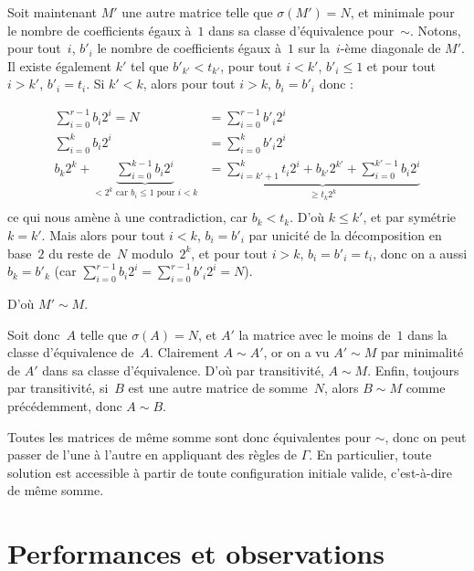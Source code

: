 Soit maintenant $M'$ une autre matrice telle que $\sigma (M')=N$, et minimale pour le nombre de coefficients égaux à~$1$ dans sa classe d'équivalence pour~$\sim$. Notons, pour tout~$i$, $b'_i$ le nombre de coefficients égaux à~$1$ sur la~$i$-ème diagonale de $M'$. Il existe également $k'$ tel que $b'_{k'} < t_{k'}$, pour tout $i<k'$, $b'_i \leq 1$ et pour tout $i>k'$, $b'_i=t_i$. Si $k'<k$, alors pour tout $i>k$, $b_i= b'_i$ donc : 


\begin{align*}
\sum\limits_{i=0}^{r-1}b_i 2^i = N &= \sum\limits_{i=0}^{r-1}b'_i 2^i\\
\sum\limits_{i=0}^k b_i 2^i &= \sum\limits_{i=0}^k b'_i 2^i\\
b_k 2^k + \underbrace{\sum\limits_{i=0}^{k-1} b_i 2^i}_{\text{$< 2^k$ car $b_i \leq 1$ pour $i<k$}} &=\underbrace{\sum\limits_{i=k'+1}^k t_i 2^i + b_{k'} 2^{k'} + \sum\limits_{i=0}^{k' -1} b_i 2^i}_{\geq t_k 2^k}\\
\end{align*}
ce qui nous amène à une contradiction, car $b_k<t_k$. D'où $k \leq k'$, et par symétrie $k = k'$. Mais alors pour tout $i<k$, $b_i = b'_i$ par unicité de la décomposition en base~$2$ du reste de~$N$ modulo~$2^k$, et pour tout $i>k$, $b_i = b'_i = t_i$, donc on a aussi $b_k = b'_k$ (car $\sum\limits_{i=0}^{r-1} b_i 2^i = \sum\limits_{i=0}^{r-1} b'_i 2^i = N$).

D'où $M' \sim M$. 

Soit donc~$A$ telle que $\sigma(A)=N$, et $A'$ la matrice avec le moins de~$1$ dans la classe d'équi\-valence de~$A$. Clairement $A \sim A'$, or on a vu $A'\sim M$ par minimalité de $A'$ dans sa classe d'équivalence. D'où par transitivité, $A \sim M$. Enfin, toujours par transitivité, si~$B$ est une autre matrice de somme~$N$, alors $B \sim M$ comme précédemment, donc $A \sim B$.

Toutes les matrices de même somme sont donc équivalentes pour $\sim$, donc on peut passer de l'une à l'autre en appliquant des règles de $\Gamma$. En particulier, toute solution est accessible à partir de toute configuration initiale valide, c'est-à-dire de même somme. 



\section{Performances et observations}


